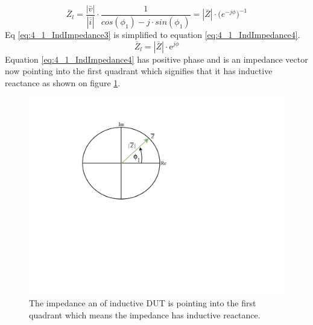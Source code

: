 \begin{equation}\label{eq:4_1_IndImpedance3} 
    \bar Z_l = \frac{|\bar v|}{|\bar i|} \cdot \frac{1}{cos(\phi_1) - j\cdot sin(\phi_1)} = |\bar Z| \cdot \mathrm (e^{-j\phi})^{-1}
\end{equation}
Eq \ref{eq:4_1_IndImpedance3} is simplified to equation \ref{eq:4_1_IndImpedance4}.
\begin{equation}\label{eq:4_1_IndImpedance4} 
    \bar Z_l =|\bar Z| \cdot \mathrm e^{j\phi}
\end{equation}
Equation \ref{eq:4_1_IndImpedance4} has positive phase and is an impedance vector now pointing into the first quadrant which signifies that it has inductive reactance as shown on figure \ref{fig:4_1_IndImpedance}.

\begin{figure}[H]
    \centering
    \includegraphics[clip, trim=0 275 0 0, width=1\textwidth]{Sections/4_TechnicalAnalysis/Figures/4_1_IndImpedance.pdf}
    \caption{The impedance an of inductive DUT is pointing into the first quadrant which means the impedance has inductive reactance.}
    \label{fig:4_1_IndImpedance}
\end{figure}
